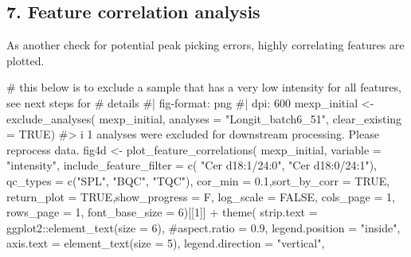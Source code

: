 \documentclass[
  letterpaper,
  DIV=11,
  numbers=noendperiod]{scrartcl}
\newenvironment{Shaded}{\begin{snugshade}}{\end{snugshade}}
\newcommand{\AttributeTok}[1]{\textcolor[rgb]{0.40,0.45,0.13}{#1}}
\newcommand{\CommentTok}[1]{\textcolor[rgb]{0.37,0.37,0.37}{#1}}
\newcommand{\ConstantTok}[1]{\textcolor[rgb]{0.56,0.35,0.01}{#1}}
\newcommand{\DecValTok}[1]{\textcolor[rgb]{0.68,0.00,0.00}{#1}}
\newcommand{\FloatTok}[1]{\textcolor[rgb]{0.68,0.00,0.00}{#1}}
\newcommand{\FunctionTok}[1]{\textcolor[rgb]{0.28,0.35,0.67}{#1}}
\newcommand{\NormalTok}[1]{\textcolor[rgb]{0.00,0.23,0.31}{#1}}
\newcommand{\OtherTok}[1]{\textcolor[rgb]{0.00,0.23,0.31}{#1}}
\newcommand{\SpecialCharTok}[1]{\textcolor[rgb]{0.37,0.37,0.37}{#1}}
\newcommand{\StringTok}[1]{\textcolor[rgb]{0.13,0.47,0.30}{#1}}
\begin{document}
\subsection{7. Feature correlation
analysis}\label{feature-correlation-analysis}

As another check for potential peak picking errors, highly correlating
features are plotted.

\begin{Shaded}
\begin{Highlighting}[]
\CommentTok{\# this below is to exclude a sample that has a very low intensity for all features, see next steps for }
\CommentTok{\# details}
\CommentTok{\#| fig{-}format: png}
\CommentTok{\#| dpi: 600}
\NormalTok{mexp\_initial }\OtherTok{\textless{}{-}} \FunctionTok{exclude\_analyses}\NormalTok{(}
\NormalTok{  mexp\_initial, }
  \AttributeTok{analyses =} \StringTok{"Longit\_batch6\_51"}\NormalTok{, }
  \AttributeTok{clear\_existing =} \ConstantTok{TRUE}\NormalTok{)}
\CommentTok{\#\textgreater{} i 1 analyses were excluded for downstream processing. Please reprocess data.}
\NormalTok{fig4d }\OtherTok{\textless{}{-}} \FunctionTok{plot\_feature\_correlations}\NormalTok{(}
\NormalTok{  mexp\_initial, }
  \AttributeTok{variable =} \StringTok{"intensity"}\NormalTok{, }
  \AttributeTok{include\_feature\_filter =} \FunctionTok{c}\NormalTok{(}
    \StringTok{"Cer d18:1/24:0"}\NormalTok{, }\StringTok{"Cer d18:0/24:1"}\NormalTok{),}
  \AttributeTok{qc\_types =} \FunctionTok{c}\NormalTok{(}\StringTok{"SPL"}\NormalTok{, }\StringTok{"BQC"}\NormalTok{, }\StringTok{"TQC"}\NormalTok{), }
  \AttributeTok{cor\_min =} \FloatTok{0.1}\NormalTok{,}\AttributeTok{sort\_by\_corr =} \ConstantTok{TRUE}\NormalTok{, }\AttributeTok{return\_plot =} \ConstantTok{TRUE}\NormalTok{,}\AttributeTok{show\_progress =}\NormalTok{ F,}
  \AttributeTok{log\_scale =} \ConstantTok{FALSE}\NormalTok{, }\AttributeTok{cols\_page =} \DecValTok{1}\NormalTok{, }\AttributeTok{rows\_page =} \DecValTok{1}\NormalTok{, }
  \AttributeTok{font\_base\_size =} \DecValTok{6}\NormalTok{)[[}\DecValTok{1}\NormalTok{]] }\SpecialCharTok{+} 
  \FunctionTok{theme}\NormalTok{(}
    \AttributeTok{strip.text =}\NormalTok{ ggplot2}\SpecialCharTok{::}\FunctionTok{element\_text}\NormalTok{(}\AttributeTok{size =} \DecValTok{6}\NormalTok{),}
    \CommentTok{\#aspect.ratio = 0.9,}
    \AttributeTok{legend.position =} \StringTok{"inside"}\NormalTok{,}
    \AttributeTok{axis.text =} \FunctionTok{element\_text}\NormalTok{(}\AttributeTok{size =} \DecValTok{5}\NormalTok{),}
    \AttributeTok{legend.direction =} \StringTok{"vertical"}\NormalTok{, }

\end{Highlighting}
\end{Shaded}
\end{document}
